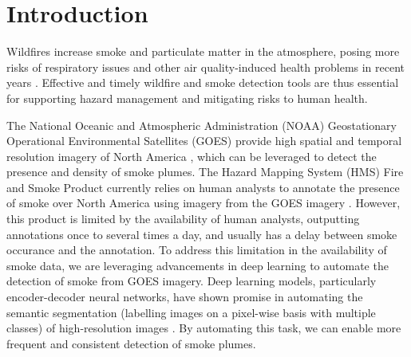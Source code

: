 \documentclass{article}
\begin{document}
\section{Introduction}
Wildfires increase smoke and particulate matter in the atmosphere, posing more risks of respiratory issues and other air quality-induced health problems in recent years \citep{wildfire-risk}. Effective and timely wildfire and smoke detection tools are thus essential for supporting hazard management and mitigating risks to human health. 

The National Oceanic and Atmospheric Administration (NOAA) Geostationary Operational Environmental Satellites (GOES) provide high spatial and temporal resolution imagery of North America \citep{GOESbook}, which can be leveraged to detect the presence and density of smoke plumes. The Hazard Mapping System (HMS) Fire and Smoke Product currently relies on human analysts to annotate the presence of smoke over North America using imagery from the GOES imagery \citep{hms}. However, this product is limited by the availability of human analysts, outputting annotations once to several times a day, and usually has a delay between smoke occurance and the annotation. To address this limitation in the availability of smoke data, we are leveraging advancements in deep learning to automate the detection of smoke from GOES imagery. Deep learning models, particularly encoder-decoder neural networks, have shown promise in automating the semantic segmentation (labelling images on a pixel-wise basis with multiple classes) of high-resolution images \citep{cv-segmentation-review}. By automating this task, we can enable more frequent and consistent detection of smoke plumes.
\end{document}

